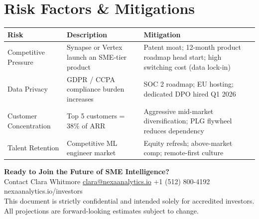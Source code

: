 \section{\sectionicon{\faExclamationTriangle}Risk Factors \& Mitigations}

\begin{tabularx}{\linewidth}{@{}lXX@{}}
  \toprule
  \rowcolor{NexaNavy}
  \color{white}\textbf{Risk} &
  \color{white}\textbf{Description} &
  \color{white}\textbf{Mitigation} \\
  \midrule
  Competitive Pressure &
    Synapse or Vertex launch an SME-tier product &
    Patent moat; 12-month product roadmap head start; high switching cost (data lock-in) \\
  \rowcolor{NexaLight}
  Data Privacy &
    GDPR / CCPA compliance burden increases &
    SOC 2 roadmap; EU hosting; dedicated DPO hired Q1 2026 \\
  Customer Concentration &
    Top 5 customers = 38\% of ARR &
    Aggressive mid-market diversification; PLG flywheel reduces dependency \\
  \rowcolor{NexaLight}
  Talent Retention &
    Competitive ML engineer market &
    Equity refresh; above-market comp; remote-first culture \\
  \bottomrule
\end{tabularx}

\vspace{10pt}

\begin{tcolorbox}[
  enhanced,
  colback=NexaNavy, colframe=NexaNavy,
  arc=5pt, boxrule=0pt,
  left=14pt, right=14pt, top=10pt, bottom=10pt,
]
  \centering
  {\color{white}\large\bfseries Ready to Join the Future of SME Intelligence?}\\[6pt]
  {\color{NexaMid}\small
    Contact Clara Whitmore \textbullet{}
    \href{mailto:clara@nexaanalytics.io}{clara@nexaanalytics.io} \textbullet{}
    +1 (512) 800-4192 \textbullet{}
    nexaanalytics.io/investors}\\[6pt]
  {\color{NexaTeal}\faLock\enspace\small
    This document is strictly confidential and intended solely for accredited investors.
    All projections are forward-looking estimates subject to change.}
\end{tcolorbox}
